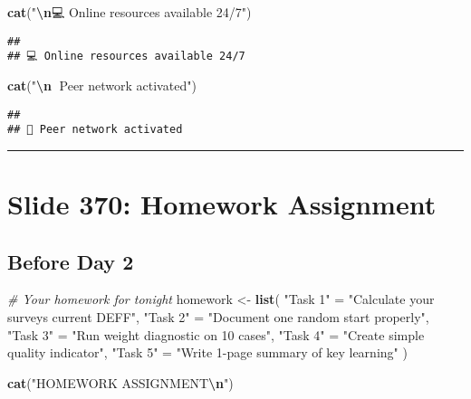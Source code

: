 \documentclass[
]{article}
\newenvironment{Shaded}{\begin{snugshade}}{\end{snugshade}}
\newcommand{\CommentTok}[1]{\textcolor[rgb]{0.56,0.35,0.01}{\textit{#1}}}
\newcommand{\FunctionTok}[1]{\textcolor[rgb]{0.13,0.29,0.53}{\textbf{#1}}}
\newcommand{\NormalTok}[1]{#1}
\newcommand{\OtherTok}[1]{\textcolor[rgb]{0.56,0.35,0.01}{#1}}
\newcommand{\SpecialCharTok}[1]{\textcolor[rgb]{0.81,0.36,0.00}{\textbf{#1}}}
\newcommand{\StringTok}[1]{\textcolor[rgb]{0.31,0.60,0.02}{#1}}
\begin{document}
\begin{Shaded}
\begin{Highlighting}[]
\FunctionTok{cat}\NormalTok{(}\StringTok{"}\SpecialCharTok{\textbackslash{}n}\StringTok{💻 Online resources available 24/7"}\NormalTok{)}
\end{Highlighting}
\end{Shaded}

\begin{verbatim}
## 
## 💻 Online resources available 24/7
\end{verbatim}

\begin{Shaded}
\begin{Highlighting}[]
\FunctionTok{cat}\NormalTok{(}\StringTok{"}\SpecialCharTok{\textbackslash{}n}\StringTok{👥 Peer network activated"}\NormalTok{)}
\end{Highlighting}
\end{Shaded}

\begin{verbatim}
## 
## 👥 Peer network activated
\end{verbatim}

\begin{center}\rule{0.5\linewidth}{0.5pt}\end{center}

\section{Slide 370: Homework
Assignment}\label{slide-370-homework-assignment}

\subsection{Before Day 2}\label{before-day-2}

\begin{Shaded}
\begin{Highlighting}[]
\CommentTok{\# Your homework for tonight}
\NormalTok{homework }\OtherTok{\textless{}{-}} \FunctionTok{list}\NormalTok{(}
  \StringTok{"Task 1"} \OtherTok{=} \StringTok{"Calculate your survey\textquotesingle{}s current DEFF"}\NormalTok{,}
  \StringTok{"Task 2"} \OtherTok{=} \StringTok{"Document one random start properly"}\NormalTok{,}
  \StringTok{"Task 3"} \OtherTok{=} \StringTok{"Run weight diagnostic on 10 cases"}\NormalTok{,}
  \StringTok{"Task 4"} \OtherTok{=} \StringTok{"Create simple quality indicator"}\NormalTok{,}
  \StringTok{"Task 5"} \OtherTok{=} \StringTok{"Write 1{-}page summary of key learning"}
\NormalTok{)}

\FunctionTok{cat}\NormalTok{(}\StringTok{"HOMEWORK ASSIGNMENT}\SpecialCharTok{\textbackslash{}n}\StringTok{"}\NormalTok{)}
\end{Highlighting}
\end{Shaded}
\end{document}
